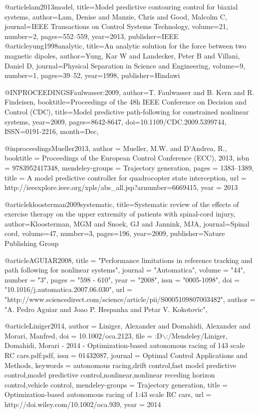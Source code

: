 @article{lam2013model,
  title={Model predictive contouring control for biaxial systems},
  author={Lam, Denise and Manzie, Chris and Good, Malcolm C},
  journal={IEEE Transactions on Control Systems Technology},
  volume={21},
  number={2},
  pages={552--559},
  year={2013},
  publisher={IEEE}
}
@article{yung1998analytic,
  title={An analytic solution for the force between two magnetic dipoles},
  author={Yung, Kar W and Landecker, Peter B and Villani, Daniel D},
  journal={Physical Separation in Science and Engineering},
  volume={9},
  number={1},
  pages={39--52},
  year={1998},
  publisher={Hindawi}
}


@INPROCEEDINGS{Faulwasser:2009,
author={T. Faulwasser and B. Kern and R. Findeisen},
booktitle={Proceedings of the 48h IEEE Conference on Decision and Control (CDC)},
title={Model predictive path-following for constrained nonlinear systems},
year={2009},
pages={8642-8647},
doi={10.1109/CDC.2009.5399744},
ISSN={0191-2216},
month={Dec},
}

@inproceedings{Mueller2013,
author = {Mueller, M.W. and D'Andrea, R.},
booktitle = {Proceedings of the European Control Conference (ECC), 2013},
isbn = {9783952417348},
mendeley-groups = {Trajectory generation},
pages = {1383--1389},
title = {{A model predictive controller for quadrocopter state interception}},
url = {http://ieeexplore.ieee.org/xpls/abs\_all.jsp?arnumber=6669415},
year = {2013}
}

@article{kloosterman2009systematic,
  title={Systematic review of the effects of exercise therapy on the upper extremity of patients with spinal-cord injury},
  author={Kloosterman, MGM and Snoek, GJ and Jannink, MJA},
  journal={Spinal cord},
  volume={47},
  number={3},
  pages={196},
  year={2009},
  publisher={Nature Publishing Group}
}

@article{AGUIAR2008,
title = "Performance limitations in reference tracking and path following for nonlinear systems",
journal = "Automatica",
volume = "44",
number = "3",
pages = "598 - 610",
year = "2008",
issn = "0005-1098",
doi = "10.1016/j.automatica.2007.06.030",
url = "http://www.sciencedirect.com/science/article/pii/S0005109807003482",
author = "A. Pedro Aguiar and Joao P. Hespanha and Petar V. Kokotovic",
}

@article{Liniger2014,
author = {Liniger, Alexander and Domahidi, Alexander and Morari, Manfred},
doi = {10.1002/oca.2123},
file = {:D$\backslash$:/Mendeley/Liniger, Domahidi, Morari - 2014 - Optimization-based autonomous racing of 143 scale RC cars.pdf:pdf},
issn = {01432087},
journal = {Optimal Control Applications and Methods},
keywords = {autonomous racing,drift control,fast model predictive control,model predictive control,nonlinear,nonlinear receding horizon control,vehicle control},
mendeley-groups = {Trajectory generation},
title = {{Optimization-based autonomous racing of 1:43 scale RC cars}},
url = {http://doi.wiley.com/10.1002/oca.939},
year = {2014}
}

